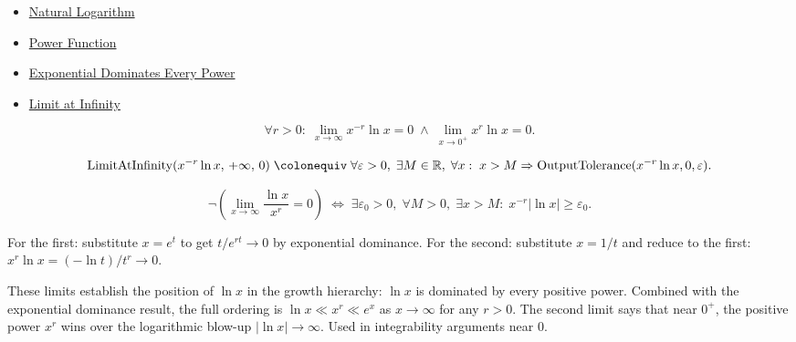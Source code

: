 \begin{dependencies}
\begin{itemize}
  \item \hyperref[def:natural-logarithm]{Natural Logarithm}
  \item \hyperref[def:power-function]{Power Function}
  \item \hyperref[prop:exponential-dominates-power]{Exponential Dominates Every Power}
  \item \hyperref[def:limit-at-infinity]{Limit at Infinity}
\end{itemize}
\end{dependencies}

\begin{remark*}
\[
  \forall r > 0 :\;
  \lim_{x \to \infty} x^{-r} \ln x = 0
  \;\wedge\;
  \lim_{x \to 0^+} x^r \ln x = 0.
\]
\end{remark*}

\begin{remark*}
\[
  \operatorname{LimitAtInfinity}(x^{-r}\ln x,\,+\infty,\,0)
  \;\colonequiv\;
  \forall\varepsilon>0,\;\exists M\in\mathbb{R},\;\forall x:\;
  x>M \Rightarrow \operatorname{OutputTolerance}(x^{-r}\ln x,0,\varepsilon).
\]
\end{remark*}

\begin{remark*}
\[
  \neg\left(\lim_{x\to\infty}\frac{\ln x}{x^r}=0\right)
  \;\iff\;
  \exists\varepsilon_0>0,\;\forall M>0,\;\exists x>M:\;
  x^{-r}|\ln x|\geq\varepsilon_0.
\]
\end{remark*}

\begin{remark*}
For the first: substitute $x = e^t$ to get $t/e^{rt} \to 0$ by
exponential dominance. For the second: substitute $x = 1/t$ and
reduce to the first: $x^r \ln x = (-\ln t)/t^r \to 0$.
\end{remark*}

\begin{remark*}[Significance]
These limits establish the position of $\ln x$ in the growth
hierarchy: $\ln x$ is dominated by every positive power. Combined
with the exponential dominance result, the full ordering is
$\ln x \ll x^r \ll e^x$ as $x \to \infty$ for any $r > 0$.
The second limit says that near $0^+$, the positive power $x^r$
wins over the logarithmic blow-up $|\ln x| \to \infty$. Used in
integrability arguments near $0$.
\end{remark*}
